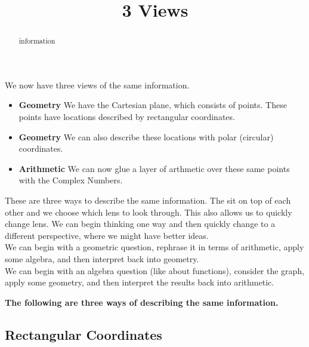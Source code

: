 \documentclass{ximera}
\title{3 Views}
\begin{document}
\begin{abstract}
information
\end{abstract}
\maketitle




We now have three views of the same information.



\begin{itemize}
\item \textbf{\textcolor{purple!85!blue}{Geometry}} We have the Cartesian plane, which consists of points.  These points have locations described by rectangular coordinates. \\

\item \textbf{\textcolor{purple!85!blue}{Geometry}} We can also describe these locations with polar (circular) coordinates. \\

\item \textbf{\textcolor{purple!85!blue}{Arithmetic}} We can now glue a layer of arthmetic over these same points with the Complex Numbers.
\end{itemize}


These are three ways to describe the same information.  The sit on top of each other and we choose which lens to look through.  This also allows us to quickly change lens.  We can begin thinking one way and then quickly change to a different perspective, where we might have better ideas. \\

We can begin with a geometric question, rephrase it in terms of arithmetic, apply some algebra, and then interpret back into geometry. \\

We can begin with an algebra question (like about functions), consider the graph, apply some geometry, and then interpret the results back into arithmetic.  \\


\qquad



\textbf{\textcolor{blue!55!black}{The following are three ways of describing the same information.}} \\

\qquad

\subsection*{Rectangular Coordinates} 
\end{document}
